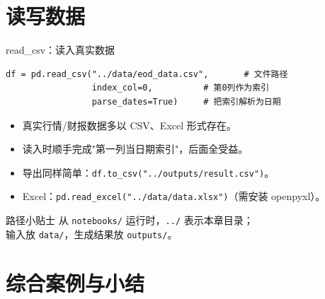 \documentclass[9pt]{ctexbeamer}
\begin{document}
\section{读写数据}

\begin{frame}[fragile]{read\_csv：读入真实数据}
	\begin{lstlisting}
df = pd.read_csv("../data/eod_data.csv",       # 文件路径
                 index_col=0,          # 第0列作为索引
                 parse_dates=True)     # 把索引解析为日期
\end{lstlisting}
	\begin{itemize}
		\item 真实行情/财报数据多以 CSV、Excel 形式存在。
		\item 读入时顺手完成"第一列当日期索引"，后面全受益。
		\item 导出同样简单：\texttt{df.to\_csv("../outputs/result.csv")}。
		\item Excel：\texttt{pd.read\_excel("../data/data.xlsx")}（需安装 openpyxl）。
	\end{itemize}
	\begin{alertblock}{路径小贴士}
		从 \texttt{notebooks/} 运行时，\texttt{../} 表示本章目录；\\
		输入放 \texttt{data/}，生成结果放 \texttt{outputs/}。
	\end{alertblock}
\end{frame}


\section{综合案例与小结}
\end{document}

